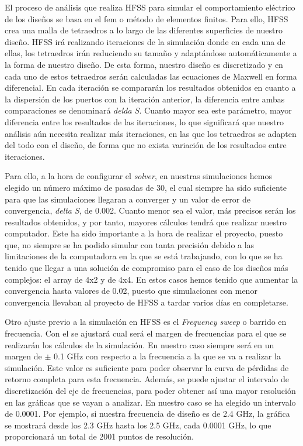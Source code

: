 \par El proceso de análisis que realiza HFSS para simular el comportamiento eléctrico de los diseños se basa en el \gls{fem} o método de elementos finitos. Para ello, HFSS crea una malla de tetraedros a lo largo de las diferentes superficies de nuestro diseño. HFSS irá realizando iteraciones de la simulación donde en cada una de ellas, los tetraedros irán reduciendo su tamaño y adaptándose automáticamente a la forma de nuestro diseño. De esta forma, nuestro diseño es discretizado y en cada uno de estos tetraedros serán calculadas las ecuaciones de Maxwell en forma diferencial. En cada iteración se compararán los resultados obtenidos en cuanto a la dispersión de los puertos con la iteración anterior, la diferencia entre ambas comparaciones se denominará \textit{delda S}. Cuanto mayor sea este parámetro, mayor diferencia entre los resultados de las iteraciones, lo que significará que nuestro análisis aún necesita realizar más iteraciones, en las que los tetraedros se adapten del todo con el diseño, de forma que no exista variación de los resultados entre iteraciones.
\\
\par Para ello, a la hora de configurar el \textit{solver}, en nuestras simulaciones hemos elegido un número máximo de pasadas de 30, el cual siempre ha sido suficiente para que las simulaciones llegaran a converger y un valor de error de convergencia, \textit{delta S}, de 0.002. Cuanto menor sea el valor, más precisos serán los resultados obtenidos, y por tanto, mayores cálculos tendrá que realizar nuestro computador. Este ha sido importante a la hora de realizar el proyecto, puesto que, no siempre se ha podido simular con tanta precisión debido a las limitaciones de la computadora en la que se está trabajando, con lo que se ha tenido que llegar a una solución de compromiso para el caso de los diseños más complejos: el array de 4x2 y de 4x4. En estos casos hemos tenido que aumentar la convergencia hasta valores de 0.02, puesto que simulaciones con menor convergencia llevaban al proyecto de HFSS a tardar varios días en completarse.
\\
\par Otro ajuste previo a la simulación en HFSS es el \textit{Frequency sweep} o barrido en frecuencia. Con el se ajustará cual será el margen de frecuencias para el que se realizarán los cálculos de la simulación. En nuestro caso siempre será en un margen de $\pm$ 0.1 GHz con respecto a la frecuencia a la que se va a realizar la simulación. Este valor es suficiente para poder observar la curva de pérdidas de retorno completa para esta frecuencia. Además, se puede ajustar el intervalo de discretización del eje de frecuencias, para poder obtener así una mayor resolución en las gráficas que se vayan a analizar. En nuestro caso se ha elegido un intervalo de 0.0001. Por ejemplo, si nuestra frecuencia de diseño es de 2.4 GHz, la gráfica se mostrará desde los 2.3 GHz hasta los 2.5 GHz, cada 0.0001 GHz, lo que proporcionará un total de 2001 puntos de resolución.
